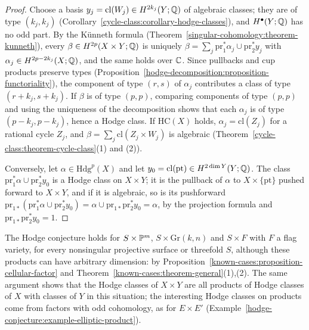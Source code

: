 \begin{proof}
Choose a basis $y_j = \mathrm{cl}(W_j) \in H^{2k_j}(Y; \mathbb{Q})$ of algebraic classes; they are of type $(k_j, k_j)$ (Corollary~\ref{cycle-class:corollary-hodge-classes}), and $H^\bullet(Y; \mathbb{Q})$ has no odd part. By the
K\"unneth formula (Theorem~\ref{singular-cohomology:theorem-kunneth}), every $\beta \in H^{2p}(X \times Y; \mathbb{Q})$ is uniquely $\beta = \sum_j\mathrm{pr}_1^*\alpha_j \cup \mathrm{pr}_2^*y_j$ with
$\alpha_j \in H^{2p-2k_j}(X; \mathbb{Q})$, and the same holds over $\mathbb{C}$. Since pullbacks and cup products preserve types (Proposition~\ref{hodge-decomposition:proposition-functoriality}), the component of type $(r, s)$ of
$\alpha_j$ contributes a class of type $(r + k_j, s + k_j)$. If $\beta$ is of type $(p, p)$, comparing components of type $(p, p)$ and using the uniqueness of the decomposition shows that each $\alpha_j$ is of type
$(p - k_j, p - k_j)$, hence a Hodge class. If $\mathrm{HC}(X)$ holds, $\alpha_j = \mathrm{cl}(Z_j)$ for a rational cycle $Z_j$, and $\beta = \sum_j\mathrm{cl}(Z_j \times W_j)$ is algebraic
(Theorem~\ref{cycle-class:theorem-cycle-class}(1) and (2)).

Conversely, let $\alpha \in \mathrm{Hdg}^p(X)$ and let $y_0 = \mathrm{cl}(\mathrm{pt}) \in H^{2\dim Y}(Y; \mathbb{Q})$. The class $\mathrm{pr}_1^*\alpha \cup \mathrm{pr}_2^*y_0$ is a Hodge class on $X \times Y$; it is the pullback of $\alpha$ to $X \times \{\mathrm{pt}\}$
pushed forward to $X \times Y$, and if it is algebraic, so is its pushforward $\mathrm{pr}_{1*}(\mathrm{pr}_1^*\alpha \cup \mathrm{pr}_2^*y_0) = \alpha \cup \mathrm{pr}_{1*}\mathrm{pr}_2^*y_0 = \alpha$, by the projection formula and
$\mathrm{pr}_{1*}\mathrm{pr}_2^*y_0 = 1$.
\end{proof}

\begin{example}\label{known-cases:example-cellular-factor}
The Hodge conjecture holds for $S \times \mathbb{P}^m$, $S \times \mathrm{Gr}(k, n)$ and $S \times F$ with $F$ a flag variety, for every nonsingular projective surface or threefold $S$, although these products can have
arbitrary dimension: by Proposition~\ref{known-cases:proposition-cellular-factor} and Theorem~\ref{known-cases:theorem-general}(1),(2). The same argument shows that the Hodge classes of $X \times Y$ are all products of Hodge
classes of $X$ with classes of $Y$ in this situation; the interesting Hodge classes on products come from factors with odd cohomology, as for $E \times E'$
(Example~\ref{hodge-conjecture:example-elliptic-product}).
\end{example}

